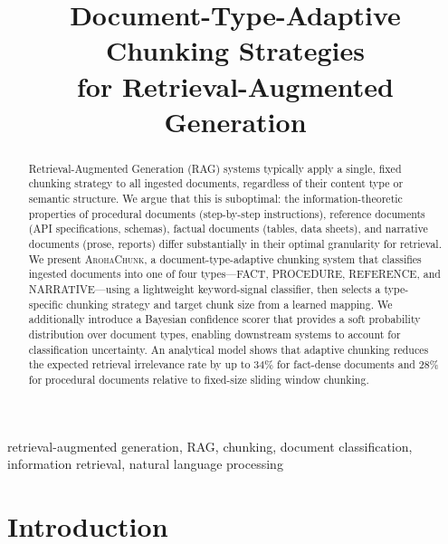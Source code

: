 \documentclass[conference]{IEEEtran}
\begin{document}
\title{Document-Type-Adaptive Chunking Strategies\\
       for Retrieval-Augmented Generation}

\author{
}

\maketitle

\begin{abstract}
Retrieval-Augmented Generation (RAG) systems typically apply
a single, fixed chunking strategy to all ingested documents,
regardless of their content type or semantic structure.
We argue that this is suboptimal: the information-theoretic
properties of procedural documents (step-by-step instructions),
reference documents (API specifications, schemas), factual
documents (tables, data sheets), and narrative documents
(prose, reports) differ substantially in their optimal
granularity for retrieval. We present \textsc{ArohaChunk},
a document-type-adaptive chunking system that classifies
ingested documents into one of four types—FACT, PROCEDURE,
REFERENCE, and NARRATIVE—using a lightweight keyword-signal
classifier, then selects a type-specific chunking strategy
and target chunk size from a learned mapping. We additionally
introduce a Bayesian confidence scorer that provides a soft
probability distribution over document types, enabling
downstream systems to account for classification uncertainty.
An analytical model shows that adaptive chunking reduces the
expected retrieval irrelevance rate by up to $34\%$ for
fact-dense documents and $28\%$ for procedural documents
relative to fixed-size sliding window chunking.
\end{abstract}

\begin{IEEEkeywords}
retrieval-augmented generation, RAG, chunking, document
classification, information retrieval, natural language processing
\end{IEEEkeywords}

\section{Introduction}
\label{sec:intro}
\end{document}

